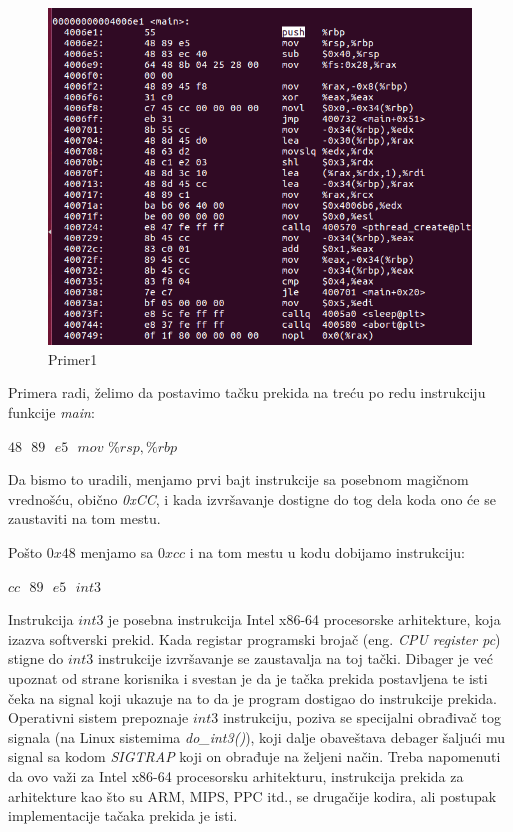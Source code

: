 \documentclass[12pt,oneside]{memoir}
\begin{document}
\begin{figure}[h!]
	\begin{center}
		\includegraphics[scale=0.4]{slike/example_bp.png}
	\end{center}
	\caption{Primer1}
	\label{fig:primer1}
\end{figure}

Primera radi, želimo da postavimo tačku prekida na treću po redu instrukciju funkcije \emph{main}:

$48$ $          $ $89$ $          $ $e5$ $          $    $ mov$  $\%rsp,\%rbp$

Da bismo to uradili, menjamo prvi bajt instrukcije sa posebnom magičnom vrednošću, obično \emph{0xCC}, i kada izvršavanje dostigne do tog dela koda ono će se zaustaviti na tom mestu.

Pošto $0x48$ menjamo sa $0xcc$ i na tom mestu u kodu dobijamo instrukciju:

$cc$ $          $ $89$ $          $ $e5$ $          $    $ int3 $

Instrukcija $ int3 $ je posebna instrukcija Intel x86-64 procesorske arhitekture, koja izazva softverski prekid. Kada registar programski brojač (eng. \emph{CPU register pc}) stigne do $ int3 $ instrukcije izvršavanje se zaustavalja na toj tački. Dibager je već upoznat od strane korisnika i svestan je da je tačka prekida postavljena te isti čeka na signal koji ukazuje na to da je program dostigao do instrukcije prekida. Operativni sistem prepoznaje $ int3 $ instrukciju, poziva se specijalni obrađivač tog signala (na Linux sistemima \emph{do\_int3()}), koji dalje obaveštava debager šaljući mu signal sa kodom \emph{SIGTRAP} koji on obrađuje na željeni način. Treba napomenuti da ovo važi za Intel x86-64 procesorsku arhitekturu, instrukcija prekida za arhitekture kao što su ARM, MIPS, PPC itd., se drugačije kodira, ali postupak implementacije tačaka prekida je isti.
\end{document}
